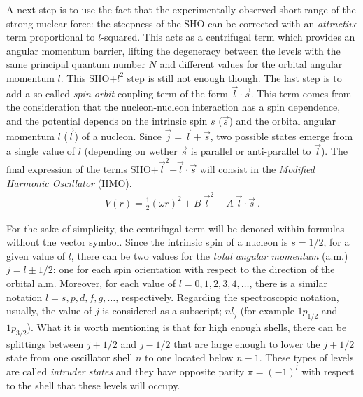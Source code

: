 A next step is to use the fact that the experimentally observed short range of the strong nuclear force: the steepness of the SHO can be corrected with an \emph{attractive} term proportional to $l$-squared. This acts as a centrifugal term which provides an angular momentum barrier, lifting the degeneracy between the levels with the same principal quantum number $N$ and different values for the orbital angular momentum $l$. This SHO+$l^2$ step is still not enough though. The last step is to add a so-called \emph{spin-orbit} coupling term of the form $\vec{l}\cdot\vec{s}$. 
This term comes from the consideration that the nucleon-nucleon interaction has a spin dependence, and the potential depends on the intrinsic spin $s$ ($\vec{s}$) and the orbital angular momentum $l$ ($\vec{l}$) of a nucleon. Since $\vec{j}=\vec{l}+\vec{s}$, two possible states emerge from a single value of $l$ (depending on wether $\vec{s}$ is parallel or anti-parallel to $\vec{l}$). The final expression of the terms SHO+$\vec{l}^2$+$\vec{l}\cdot\vec{s}$ will consist in the \emph{Modified Harmonic Oscillator} (HMO).
\begin{align}
    V(r)=\frac{1}{2}(\omega r)^2+B\ \vec{l}^2+A\ \vec{l}\cdot\vec{s}\ .
    \label{modified-harmonic-oscillator-eq}
\end{align}

For the sake of simplicity, the centrifugal term will be denoted within formulas without the vector symbol. Since the intrinsic spin of a nucleon is $s=1/2$, for a given value of $l$, there can be two values for the \emph{total angular momentum} (a.m.) $j=l\pm1/2$: one for each spin orientation with respect to the direction of the orbital a.m. Moreover, for each value of $l=0,1,2,3,4,\dots$, there is a similar notation $l=s,p,d,f,g,\dots$, respectively. Regarding the spectroscopic notation, usually, the value of $j$ is considered as a subscript; $nl_j$ (for example $1p_{1/2}$ and $1p_{3/2}$). What it is worth mentioning is that for high enough shells, there can be splittings between $j+1/2$ and $j-1/2$ that are large enough to lower the $j+1/2$ state from one oscillator shell $n$ to one located below $n-1$. These types of levels are called \emph{intruder states} and they have opposite parity $\pi=(-1)^l$ with respect to the shell that these levels will occupy.

